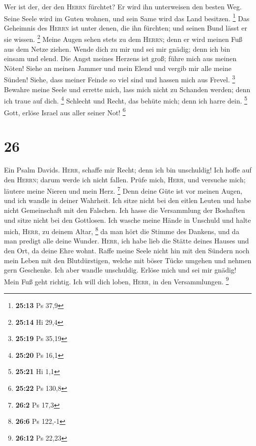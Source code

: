  Wer ist der, der den \textsc{Herrn} fürchtet? Er wird
ihn unterweisen den besten Weg.  Seine Seele wird im
Guten wohnen, und sein Same wird das Land besitzen. \footnote{\textbf{25:13}
  Ps 37,9}  Das Geheimnis des \textsc{Herrn} ist unter
denen, die ihn fürchten; und seinen Bund lässt er sie wissen.
\footnote{\textbf{25:14} Hi 29,4}  Meine Augen sehen
stets zu dem \textsc{Herrn}; denn er wird meinen Fuß aus dem Netze
ziehen.  Wende dich zu mir und sei mir gnädig; denn ich
bin einsam und elend.  Die Angst meines Herzens ist groß;
führe mich aus meinen Nöten!  Siehe an meinen Jammer und
mein Elend und vergib mir alle meine Sünden!  Siehe, dass
meiner Feinde so viel sind und hassen mich aus Frevel. \footnote{\textbf{25:19}
  Ps 35,19}  Bewahre meine Seele und errette mich, lass
mich nicht zu Schanden werden; denn ich traue auf dich. \footnote{\textbf{25:20}
  Ps 16,1}  Schlecht und Recht, das behüte mich; denn ich
harre dein. \footnote{\textbf{25:21} Hi 1,1}  Gott,
erlöse Israel aus aller seiner Not! \footnote{\textbf{25:22} Ps 130,8}

\hypertarget{section-11}{%
\section{26}\label{section-11}}

 Ein Psalm Davids. \textsc{Herr}, schaffe mir Recht; denn
ich bin unschuldig! Ich hoffe auf den \textsc{Herrn}; darum werde ich
nicht fallen.  Prüfe mich, \textsc{Herr}, und versuche
mich; läutere meine Nieren und mein Herz. \footnote{\textbf{26:2} Ps
  17,3}  Denn deine Güte ist vor meinen Augen, und ich
wandle in deiner Wahrheit.  Ich sitze nicht bei den eitlen
Leuten und habe nicht Gemeinschaft mit den Falschen.  Ich
hasse die Versammlung der Boshaften und sitze nicht bei den Gottlosen.
 Ich wasche meine Hände in Unschuld und halte mich,
\textsc{Herr}, zu deinem Altar, \footnote{\textbf{26:6} Ps 122,-1}
 da man hört die Stimme des Dankens, und da man predigt
alle deine Wunder.  \textsc{Herr}, ich habe lieb die
Stätte deines Hauses und den Ort, da deine Ehre wohnt. 
Raffe meine Seele nicht hin mit den Sündern noch mein Leben mit den
Blutdürstigen,  welche mit böser Tücke umgehen und nehmen
gern Geschenke.  Ich aber wandle unschuldig. Erlöse mich
und sei mir gnädig!  Mein Fuß geht richtig. Ich will dich
loben, \textsc{Herr}, in den Versammlungen. \footnote{\textbf{26:12} Ps
  22,23}

